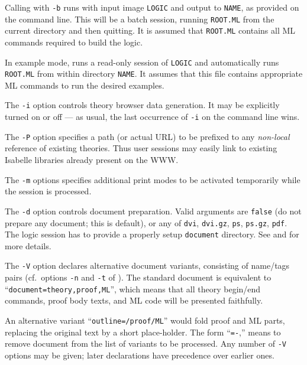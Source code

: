 \begin{isabellebody}
\begin{isamarkuptext}
  Calling \hyperlink{tool.usedir}{\mbox{}} with \verb|-b| runs \hyperlink{executable.isabelle-process}{\mbox{}} with input image \verb|LOGIC| and output to
  \verb|NAME|, as provided on the command line. This will be a
  batch session, running \verb|ROOT.ML| from the current
  directory and then quitting.  It is assumed that \verb|ROOT.ML|
  contains all ML commands required to build the logic.

  In example mode, \hyperlink{tool.usedir}{\mbox{}} runs a read-only session of
  \verb|LOGIC| and automatically runs \verb|ROOT.ML| from
  within directory \verb|NAME|.  It assumes that this file
  contains appropriate ML commands to run the desired examples.

  \medskip The \verb|-i| option controls theory browser data
  generation. It may be explicitly turned on or off --- as usual, the
  last occurrence of \verb|-i| on the command line wins.

  The \verb|-P| option specifies a path (or actual URL) to be
  prefixed to any \emph{non-local} reference of existing theories.
  Thus user sessions may easily link to existing Isabelle libraries
  already present on the WWW.

  The \verb|-m| options specifies additional print modes to be
  activated temporarily while the session is processed.

  \medskip The \verb|-d| option controls document preparation.
  Valid arguments are \verb|false| (do not prepare any document;
  this is default), or any of \verb|dvi|, \verb|dvi.gz|,
  \verb|ps|, \verb|ps.gz|, \verb|pdf|.  The logic
  session has to provide a properly setup \verb|document|
  directory.  See  and
   for more details.

  \medskip The \verb|-V| option declares alternative document
  variants, consisting of name/tags pairs (cf.\ options \verb|-n| and \verb|-t| of \hyperlink{tool.document}{\mbox{}}).  The standard
  document is equivalent to ``\verb|document=theory,proof,ML|'', which means that all theory begin/end
  commands, proof body texts, and ML code will be presented
  faithfully.

  An alternative variant ``\verb|outline=/proof/ML|'' would
  fold proof and ML parts, replacing the original text by a short
  place-holder.  The form ``\verb|=-|,'' means to
  remove document  from the list of variants to be
  processed.  Any number of \verb|-V| options may be given;
  later declarations have precedence over earlier ones.


\end{isamarkuptext}
\end{isabellebody}
